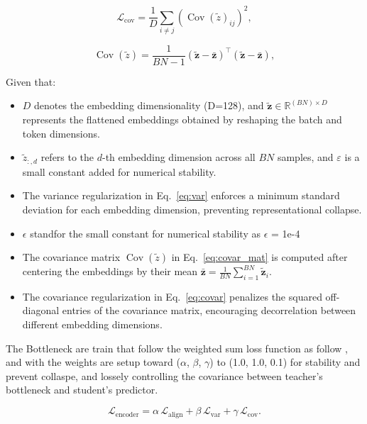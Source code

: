 \begin{equation}
\label{eq:covar}
\mathcal{L}_{\text{cov}}
=
\frac{1}{D}
\sum_{i \neq j}
\left(
\operatorname{Cov}(\tilde{z})_{ij}
\right)^2,
\end{equation}

\begin{equation}
\label{eq:covar_mat}
\operatorname{Cov}(\tilde{z})
=
\frac{1}{BN - 1}
\left(
\tilde{\mathbf{z}} - \bar{\mathbf{z}}
\right)^{\!\top}
\left(
\tilde{\mathbf{z}} - \bar{\mathbf{z}}
\right),
\end{equation}

Given that:

\begin{itemize}
    \item $D$ denotes the embedding dimensionality (D=128), and
    $\tilde{\mathbf{z}} \in \mathbb{R}^{(BN)\times D}$ represents the flattened
    embeddings obtained by reshaping the batch and token dimensions.
    \item $\tilde{z}_{:,d}$ refers to the $d$-th embedding dimension across
    all $BN$ samples, and $\varepsilon$ is a small constant added for numerical
    stability.
    \item The variance regularization in Eq.~\eqref{eq:var} enforces a minimum
    standard deviation for each embedding dimension, preventing representational
    collapse.
    \item $\epsilon$ standfor the small constant for numerical stability as $\epsilon$ = 1e-4
    
    \item The covariance matrix $\operatorname{Cov}(\tilde{z})$ in
    Eq.~\eqref{eq:covar_mat} is computed after centering the embeddings by their
    mean $\bar{\mathbf{z}} = \frac{1}{BN}\sum_{i=1}^{BN}\tilde{\mathbf{z}}_i$.
    \item The covariance regularization in Eq.~\eqref{eq:covar} penalizes the
    squared off-diagonal entries of the covariance matrix, encouraging
    decorrelation between different embedding dimensions.
\end{itemize}

The Bottleneck are train that follow the weighted sum loss function as follow \cite{bardes_2022_vicreg, assran_2025_vjepa, zhu_2025_selfsupervised}, and with the weights are setup toward  ($\alpha$, $\beta$, $\gamma$) to (1.0, 1.0, 0.1) for stability and prevent collaspe, and lossely controlling the covariance between teacher's bottleneck and student's predictor.

\begin{equation}
\mathcal{L}_{\text{encoder}}
=
\alpha\,\mathcal{L}_{\text{align}}
+
\beta\,\mathcal{L}_{\text{var}}
+
\gamma\,\mathcal{L}_{\text{cov}}.
\end{equation}

